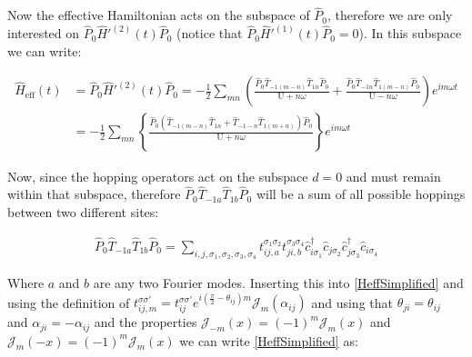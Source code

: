 Now the effective Hamiltonian acts on the subspace of $\hat{P}_0$, therefore we are only interested on $\hat{P}_0 \hat{H}'^{(2)}(t) \hat{P}_0$ (notice that $\hat{P}_0 \hat{H}'^{(1)}(t) \hat{P}_0 = 0$). In this subspace we can write:

\begin{align}
\hat{H}_{\text{eff}}(t) &= \hat{P}_0\hat{H}'^{(2)}(t)\hat{P}_0 = -\frac{1}{2}\sum_{mn} \left( \frac{\hat{P}_0  \hat{T}_{-1(m-n)}\hat{T}_{1n}\hat{P}_0}{\text{U}+n\omega} + \frac{\hat{P}_0 \hat{T}_{-1n} \hat{T}_{1(m-n)} \hat{P}_0}{\text{U}-n\omega} \right) e^{im\omega t} \nonumber \\
&= -\frac{1}{2}\sum_{mn} \left\{ \frac{\hat{P}_0  (\hat{T}_{-1(m-n)}\hat{T}_{1n} + \hat{T}_{-1-n}\hat{T}_{1(m+n)})\hat{P}_0}{\text{U}+n\omega} \right\} e^{im\omega t}
\end{align}

Now, since the hopping operators act on the subspace $d=0$ and must remain within that subspace, therefore $\hat{P}_0 \hat{T}_{-1a} \hat{T}_{1b} \hat{P}_0$ will be a sum of all possible hoppings between two different sites:

\begin{align*}
\hat{P}_0 \hat{T}_{-1a} \hat{T}_{1b} \hat{P}_0 = \sum_{i,j, \sigma_1, \sigma_2, \sigma_3, \sigma_4} t_{ij,a}^{\sigma_1 \sigma_2} t_{ji,b}^{\sigma_3 \sigma_4} \hat{c}_{i \sigma_1}^\dagger \hat{c}_{j \sigma_2} \hat{c}_{j \sigma_3}^\dagger \hat{c}_{i \sigma_4}
\end{align*}

Where $a$ and $b$ are any two Fourier modes. Inserting this into \ref{HeffSimplified} and using the definition of $t_{ij,m}^{\sigma \sigma'} = t_{ij}^{\sigma \sigma'} e^{i(\frac{\pi}{2}-\theta_{ij})m} \mathcal{J}_m(\alpha_{ij})$ and using that $\theta_{ji} = \theta_{ij}$ and $\alpha_{ji} = -\alpha_{ij}$ and the properties $\mathcal{J}_{-m}(x) = (-1)^m\mathcal{J}_m(x)$ and $\mathcal{J}_m(-x) = (-1)^m\mathcal{J}_m(x)$ we can write \ref{HeffSimplified} as:

